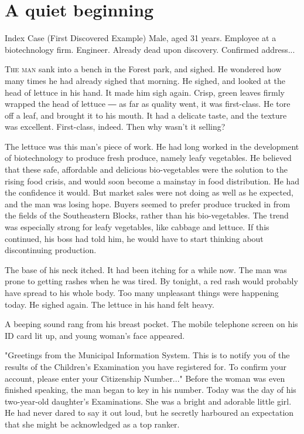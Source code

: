 
\chapter{A quiet beginning}

\begin{boxed}{Index Case (First Discovered Example)}
	Male, aged 31 years. Employee at a biotechnology firm. Engineer. Already
	dead upon discovery. Confirmed address...
\end{boxed}

\lettrine{T}{he man} sank into a bench in the Forest park, and sighed. He wondered
how many times he had already sighed that morning. He sighed, and looked
at the head of lettuce in his hand. It made him sigh again. Crisp, green
leaves firmly wrapped the head of lettuce ― as far as quality went, it
was first-class. He tore off a leaf, and brought it to his mouth. It had
a delicate taste, and the texture was excellent. First-class, indeed.
Then why wasn't it selling?

The lettuce was this man's piece of work. He had long worked in the
development of biotechnology to produce fresh produce, namely leafy
vegetables. He believed that these safe, affordable and delicious
bio-vegetables were the solution to the rising food crisis, and would
soon become a mainstay in food distribution. He had the confidence it
would. But market sales were not doing as well as he expected, and the
man was losing hope. Buyers seemed to prefer produce trucked in from the
fields of the Southeastern Blocks, rather than his bio-vegetables. The
trend was especially strong for leafy vegetables, like cabbage and
lettuce. If this continued, his boss had told him, he would have to
start thinking about discontinuing production.

The base of his neck itched. It had been itching for a while now. The
man was prone to getting rashes when he was tired. By tonight, a red
rash would probably have spread to his whole body. Too many unpleasant
things were happening today. He sighed again. The lettuce in his hand
felt heavy.

A beeping sound rang from his breast pocket. The mobile telephone screen
on his ID card lit up, and young woman's face appeared.

"Greetings from the Municipal Information System. This is to notify you
of the results of the Children's Examination you have registered for. To
confirm your account, please enter your Citizenship Number..." Before
the woman was even finished speaking, the man began to key in his
number. Today was the day of his two-year-old daughter's Examinations.
She was a bright and adorable little girl. He had never dared to say it
out loud, but he secretly harboured an expectation that she might be
acknowledged as a top ranker.

